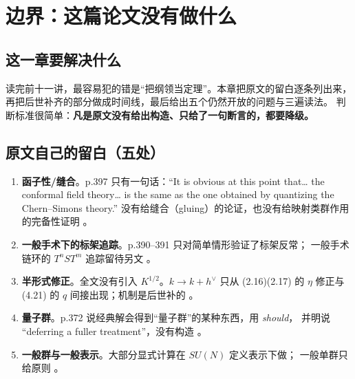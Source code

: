 \section{边界：这篇论文没有做什么}\label{sec:boundary}

\subsection{这一章要解决什么}
读完前十一讲，最容易犯的错是“把纲领当定理”。本章把原文的留白逐条列出来，
再把后世补齐的部分做成时间线，最后给出五个仍然开放的问题与三遍读法。
判断标准很简单：\textbf{凡是原文没有给出构造、只给了一句断言的，都要降级。}

\subsection{原文自己的留白（五处）}
\begin{enumerate}[label=B\arabic*,leftmargin=*]
  \item \textbf{函子性/缝合}。p.397 只有一句话：“It is obvious at this point that…
        the conformal field theory… is the same as the one obtained by quantizing the
        Chern--Simons theory.” 没有给缝合（gluing）的论证，也没有给映射类群作用的完备性证明 。
  \item \textbf{一般手术下的标架追踪}。p.390--391 只对简单情形验证了标架反常；
        一般手术链环的 $T^nST^m$ 追踪留待另文 。
  \item \textbf{半形式修正}。全文没有引入 $K^{1/2}$。$k\to k+h^\vee$ 只从
        (2.16)(2.17) 的 $\eta$ 修正与 (4.21) 的 $q$ 间接出现；机制是后世补的 。
  \item \textbf{量子群}。p.372 说经典解会得到“量子群”的某种东西，用 \emph{should}，
        并明说 “deferring a fuller treatment”，没有构造 。
  \item \textbf{一般群与一般表示}。大部分显式计算在 $SU(N)$ 定义表示下做；
        一般单群只给原则 。
\end{enumerate}

